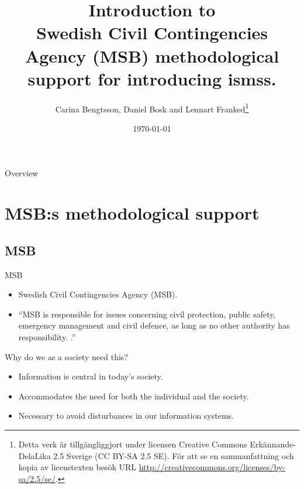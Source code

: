 \documentclass{beamer}
\title[Intro MSB]{%
  Introduction to\\
  Swedish Civil Contingencies Agency (MSB) methodological support for introducing \acp{isms}.
}
\author{Carina Bengtsson, Daniel Bosk and Lennart Franked\footnote{%
  Detta verk är tillgängliggjort under licensen Creative Commons 
  Erkännande-DelaLika 2.5 Sverige (CC BY-SA 2.5 SE).
	För att se en sammanfattning och kopia av licenstexten besök URL 
	\url{http://creativecommons.org/licenses/by-sa/2.5/se/}.
}}
\institute[MIUN IST]{%
  Department of Informationsystem and Technologies (IST),\\
  Mid Sweden University, Sundsvall.
	
}
\date{\today}
\begin{document}
\begin{frame}
  \titlepage{}
\end{frame}

\begin{frame}{Overview}
	\tableofcontents
\end{frame}





\section[Methodilogical support]{MSB:s methodological support}

\subsection{MSB}

\begin{frame}{MSB}
  \begin{itemize}
    \item Swedish Civil Contingencies Agency (MSB).
    \item \enquote{MSB is responsible for issues concerning civil protection,
        public safety, emergency management and civil defence, as long as no
        other authority has responsibility\cite[About MSB]{msbse}\@.
        .}
  \end{itemize}
\end{frame}


\begin{frame}{Why do we as a society need this?}
  \begin{itemize}
    \item Information is central in today's society.
    \item Accommodates the need for both the individual and the society.
    \item Necessary to avoid disturbances in our information systems.
  \end{itemize}
\end{frame}
\end{document}
